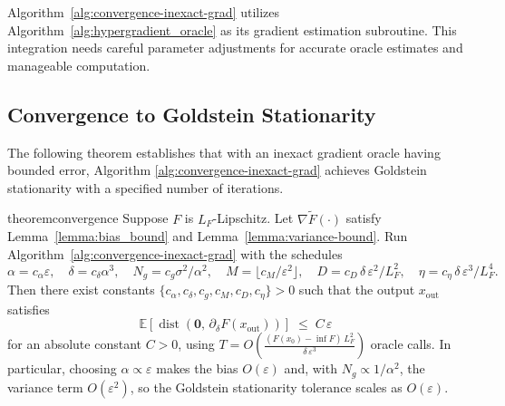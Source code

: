 \documentclass[letterpaper]{article} %
\newcommand{\1}{\mathbf{1}}
\begin{document}
\begin{remark}\label{rem:algorithm_relationship_nsn}
Algorithm~\ref{alg:convergence-inexact-grad} utilizes Algorithm~\ref{alg:hypergradient_oracle} as its gradient estimation subroutine. This integration needs careful parameter adjustments for accurate oracle estimates and manageable computation.
\end{remark}
\subsection{Convergence to Goldstein Stationarity}


The following theorem establishes that with an inexact gradient oracle having bounded error, Algorithm \ref{alg:convergence-inexact-grad} achieves Goldstein stationarity with a specified number of iterations.

\begin{restatable}{theorem}{convergence}\label{thm:convergence-stochastic-grad}
Suppose $F$ is $L_F$-Lipschitz. Let $\nabla\tilde{F}(\cdot)$ satisfy Lemma~\ref{lemma:bias_bound} and Lemma~\ref{lemma:variance-bound}. Run Algorithm~\ref{alg:convergence-inexact-grad} with the schedules
\[
\alpha=c_{\alpha}\varepsilon,\quad \delta=c_{\delta}\alpha^{3},\quad N_g=c_g\sigma^{2}/\alpha^{2},\quad M=\lfloor c_{M}/\varepsilon^{2}\rfloor,\quad D=c_{D}\,\delta\,\varepsilon^{2}/L_{F}^{2},\quad \eta=c_{\eta}\,\delta\,\varepsilon^{3}/L_{F}^{4}.
\]
Then there exist constants $\{c_{\alpha},c_{\delta},c_g,c_M,c_D,c_{\eta}\}>0$ such that the output $x_{\text{out}}$ satisfies
\[
\mathbb{E}[\operatorname{dist}(\mathbf{0},\, \partial_{\delta}F(x_{\text{out}}))] 
\;\le\; C\,\varepsilon
\]
for an absolute constant $C>0$, using 
\(
T = O\!\left( \tfrac{(F(x_0)-\inf F)\, L_F^{2}}{\delta\, \varepsilon^{3}} \right)
\)
oracle calls. In particular, choosing $\alpha\propto\varepsilon$ makes the bias $O(\varepsilon)$ and, with $N_g\propto 1/\alpha^{2}$, the variance term $O(\varepsilon^{2})$, so the Goldstein stationarity tolerance scales as $O(\varepsilon)$.
\end{restatable}
\end{document}
